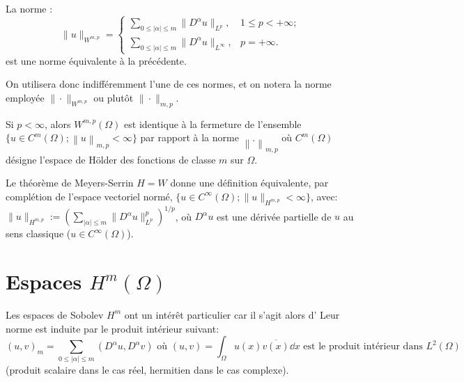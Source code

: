 \medskip
La norme :
\begin{equation}
\| u \|_{W^{m, p}} = \begin{cases} \sum\limits _{0\leqslant | \alpha | \leqslant m} \| D^{\alpha} u \|_{L^{p}}, & 1 \leqslant p < + \infty; \\ \sum\limits _{0 \leqslant | \alpha | \leqslant m} \| D^{\alpha} u \|_{L^{\infty}}, & p = + \infty. \end{cases} \end{equation}
est une norme équivalente à la précédente.

On utilisera donc indifféremment l'une de ces normes, et on notera la norme
employée $\|\cdot\|_{W^{m, p}}$ ou plutôt $\|\cdot\|_{m, p}$.


\medskip{}
Si $p<\infty$, alors $W^{m,p}(\Omega)$ est identique à la fermeture de l'ensemble
$\lbrace u \in C^m(\Omega) ; \left\|u \right\|_{m,p} < \infty \rbrace$ par rapport à la norme
$\left\| . \right\|_{m,p}$ où $C^m(\Omega)$ désigne l'espace de H\"older des fonctions de
classe $m$ sur $\Omega$.

\medskip
Le théorème de Meyers-Serrin $H=W$ donne une définition équivalente, par complétion de l'espace
vectoriel normé,
$
\{u\in C^\infty(\Omega);\| u \|_{H^{m, p}} < \infty\}
$,
avec:
$
\| u \|_{H^{m, p}} := \left( \sum_{| \alpha | \leqslant m} \| D^{\alpha} u \|_{L^{p}}^p \right)^{1/p}
$,
où $D^\alpha u$ est une dérivée partielle de $u$ au sens classique ($u \in C^\infty(\Omega)$).


\medskip
\section{Espaces $H^m(\Omega)$}

\begin{definition}
\end{definition}

\medskip
\begin{theoreme}
Les espaces de Sobolev $H^m$ ont un intérêt particulier car il s'agit alors d'
Leur norme est induite par le produit intérieur suivant:
\begin{equation}\left( u , v \right)_{m} =\sum \limits _{0 \leqslant \vert \alpha\vert\leqslant m} \left( D^{\alpha} u, D^{\alpha} v\right)
\text{ où } \left( u , v \right) = \int_{\Omega} u(x) \overline{v(x)} \dd x \text{ est le produit intérieur dans } L^{2} \left( \Omega \right)
\end{equation}
(produit scalaire dans le cas réel, hermitien dans le cas complexe).
\end{theoreme}

